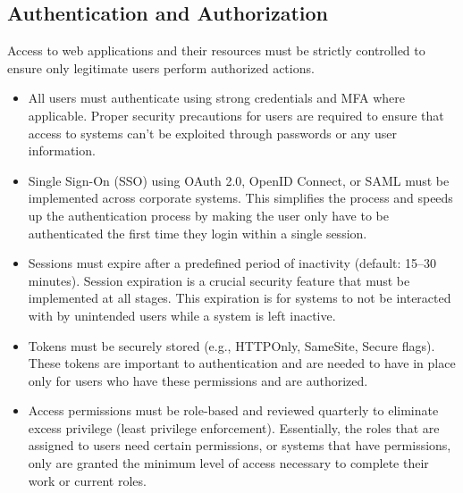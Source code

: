 \subsection{Authentication and Authorization}
Access to web applications and their resources must be strictly controlled to ensure only legitimate users perform authorized actions.
\begin{itemize}
    \item All users must authenticate using strong credentials and MFA where applicable. Proper security precautions for users are required to ensure that access to systems can’t be exploited through passwords or any user information.
    \item Single Sign-On (SSO) using OAuth 2.0, OpenID Connect, or SAML must be implemented across corporate systems. This simplifies the process and speeds up the authentication process by making the user only have to be authenticated the first time they login within a single session.
    \item Sessions must expire after a predefined period of inactivity (default: 15–30 minutes). Session expiration is a crucial security feature that must be implemented at all stages. This expiration is for systems to not be interacted with by unintended users while a system is left inactive.
    \item Tokens must be securely stored (e.g., HTTPOnly, SameSite, Secure flags). These tokens are important to authentication and are needed to have in place only for users who have these permissions and are authorized.
    \item Access permissions must be role-based and reviewed quarterly to eliminate excess privilege (least privilege enforcement). Essentially, the roles that are assigned to users need certain permissions, or systems that have permissions, only are granted the minimum level of access necessary to complete their work or current roles.
\end{itemize}
